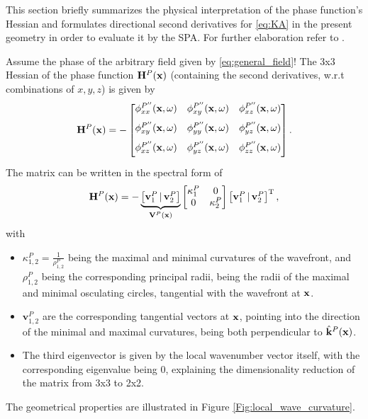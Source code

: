 \label{app:hessian}
This section briefly summarizes the physical interpretation of the phase function's Hessian and formulates directional second derivatives for \eqref{eq:KA} in the present geometry in order to evaluate it by the SPA.
For further elaboration refer to \cite[App. B]{Firtha2019phd}.

Assume the phase of the arbitrary field given by \eqref{eq:general_field}!
The 3x3 Hessian of the phase function $\mathbf{H}^P(\mathbf{x})$ (containing the second derivatives, w.r.t combinations of $x,y,z$) is given by
\begin{equation}
  \mathbf{H}^P(\mathbf{x}) = -
  \begin{bmatrix} 
    \phi^{P''}_{xx}(\mathbf{x},\omega) & \phi^{P''}_{xy}(\mathbf{x},\omega) & \phi^{P''}_{xz}(\mathbf{x},\omega) \\[.7em]
    \phi^{P''}_{xy}(\mathbf{x},\omega) & \phi^{P''}_{yy}(\mathbf{x},\omega) & \phi^{P''}_{yz}(\mathbf{x},\omega) \\[.7em]
    \phi^{P''}_{xz}(\mathbf{x},\omega) & \phi^{P''}_{yz}(\mathbf{x},\omega) & \phi^{P''}_{zz}(\mathbf{x},\omega) \\[0.5em]    \end{bmatrix}.
\end{equation}
The matrix can be written in the spectral form of
\begin{equation}
  \mathbf{H}^P(\mathbf{x}) = - \underbrace{\begin{bmatrix} \mathbf{v}^P_1 \, |\, \mathbf{v}^P_2 \\\end{bmatrix}}_{\mathbf{V}^P(\mathbf{x})} 
  \begin{bmatrix} \kappa^P_1 & 0 \\[.0em] 0 & \kappa^P_2 \\[0.0em] \end{bmatrix}
  \begin{bmatrix} \mathbf{v}^P_1 \, | \, \mathbf{v}^P_2 \\\end{bmatrix}^{\mathrm{T}},
\end{equation}
with 
\begin{itemize}
  \item $\kappa^P_{1,2} = \frac{1}{\rho^P_{1,2}}$ being the maximal and minimal curvatures of the wavefront, and $\rho^P_{1,2}$ being the corresponding principal radii, being the radii of the maximal and minimal osculating circles, tangential with the wavefront at $\mathbf{x}$.
  \item $\mathbf{v}^P_{1,2}$ are the corresponding tangential vectors at $\mathbf{x}$, pointing into the direction of the minimal and maximal curvatures, being both perpendicular to $\hat{\mathbf{k}}^P(\mathbf{x})$.
  \item The third eigenvector is given by the local wavenumber vector itself, with the corresponding eigenvalue being 0, explaining the dimensionality reduction of the matrix from 3x3 to 2x2.
\end{itemize}
The geometrical properties are illustrated in Figure \ref{Fig:local_wave_curvature}.

